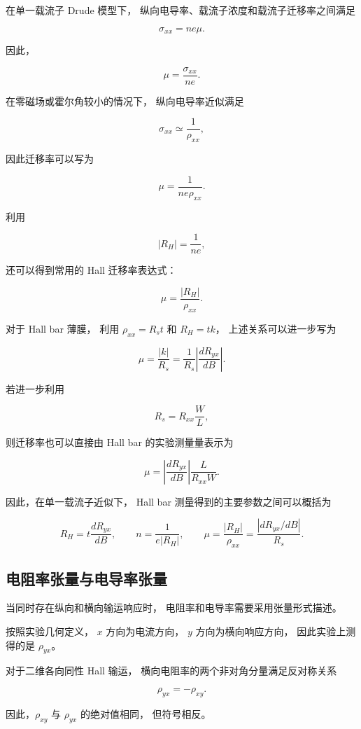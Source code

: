 \documentclass[openany]{book}
\theoremstyle{mydefinition}
\theoremstyle{myplain}
\begin{document}
在单一载流子 Drude 模型下，
纵向电导率、载流子浓度和载流子迁移率之间满足

\[
\sigma_{xx}
=
ne\mu.
\]

因此，

\[
\mu
=
\frac{\sigma_{xx}}{ne}.
\]

在零磁场或霍尔角较小的情况下，
纵向电导率近似满足

\[
\sigma_{xx}
\simeq
\frac{1}{\rho_{xx}},
\]

因此迁移率可以写为

\[
\mu
=
\frac{1}{ne\rho_{xx}}.
\]

利用

\[
|R_H|
=
\frac{1}{ne},
\]

还可以得到常用的 Hall 迁移率表达式：

\[
\mu
=
\frac{|R_H|}{\rho_{xx}}.
\]

对于 Hall bar 薄膜，
利用
\(\rho_{xx}=R_s t\)
和
\(R_H=tk\)，
上述关系可以进一步写为

\[
\mu
=
\frac{|k|}{R_s}
=
\frac{1}{R_s}
\left|
\frac{dR_{yx}}{dB}
\right|.
\]

若进一步利用

\[
R_s
=
R_{xx}\frac{W}{L},
\]

则迁移率也可以直接由 Hall bar 的实验测量量表示为

\[
\mu
=
\left|
\frac{dR_{yx}}{dB}
\right|
\frac{L}{R_{xx}W}.
\]

因此，在单一载流子近似下，
Hall bar 测量得到的主要参数之间可以概括为

\[
R_H
=
t\frac{dR_{yx}}{dB},
\qquad
n
=
\frac{1}{e|R_H|},
\qquad
\mu
=
\frac{|R_H|}{\rho_{xx}}
=
\frac{\left|dR_{yx}/dB\right|}{R_s}.
\]


\subsection{电阻率张量与电导率张量}

当同时存在纵向和横向输运响应时，
电阻率和电导率需要采用张量形式描述。

按照实验几何定义，
\(x\) 方向为电流方向，
\(y\) 方向为横向响应方向，
因此实验上测得的是 \(\rho_{yx}\)。

对于二维各向同性 Hall 输运，
横向电阻率的两个非对角分量满足反对称关系

\[
\rho_{yx}
=
-\rho_{xy}.
\]

因此，\(\rho_{xy}\) 与 \(\rho_{yx}\) 的绝对值相同，
但符号相反。
\end{document}
